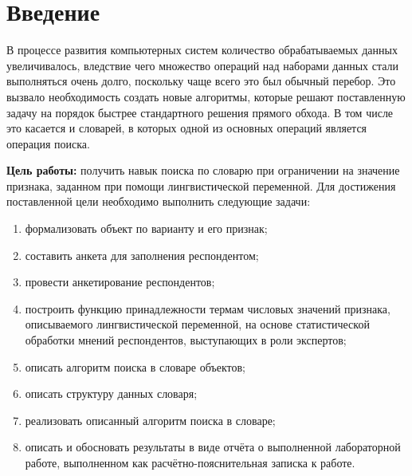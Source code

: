 \chapter*{Введение}

В процессе развития компьютерных систем количество обрабатываемых данных увеличивалось, вледствие чего множество операций над наборами данных стали выполняться очень долго, поскольку чаще всего это был обычный перебор. 
Это вызвало необходимость создать новые алгоритмы, которые решают поставленную задачу на порядок быстрее стандартного решения прямого обхода. 
В том числе это касается и словарей, в которых одной из основных операций является операция поиска.


\textbf{Цель работы:} получить навык поиска по словарю при ограничении на значение признака, заданном при помощи лингвистической переменной.
Для достижения поставленной цели необходимо выполнить следующие задачи:
\begin{enumerate}[label=\arabic*)]
	\item формализовать объект по варианту и его признак;
	\item составить анкета для заполнения респондентом;
	\item провести анкетирование респондентов;
	\item построить функцию принадлежности термам числовых значений признака, описываемого лингвистической переменной, на основе статистической обработки мнений респондентов, выступающих в роли экспертов;
	\item описать алгоритм поиска в словаре объектов;
	\item описать структуру данных словаря;
	\item реализовать описанный алгоритм поиска в словаре;
	\item описать и обосновать результаты в виде отчёта о выполненной лабораторной работе, выполненном как расчётно-пояснительная записка к работе.
\end{enumerate}